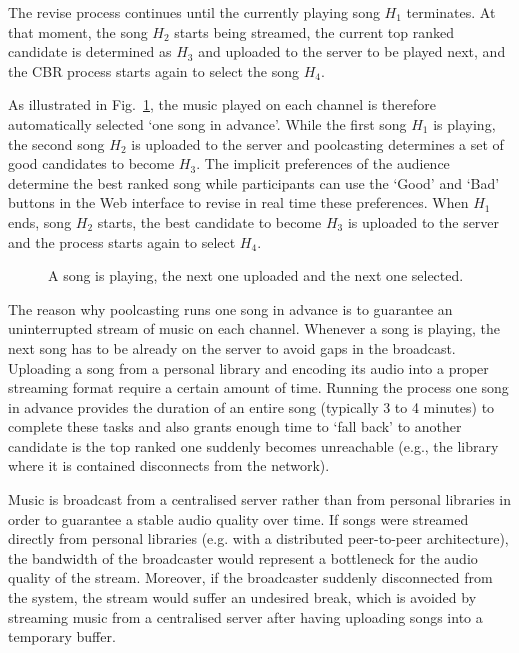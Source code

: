 The revise process continues until the currently playing song $H_1$ terminates. At that moment, the song $H_2$ starts being streamed, the current top ranked candidate is determined as $H_3$ and uploaded to the server to be played next, and the CBR process starts again to select the song $H_4$.

As illustrated in Fig.~\ref{fig:select_and_deliver}, the music played on each channel is therefore automatically selected `one song in advance'.
While the first song $H_1$ is playing, the second song $H_2$ is uploaded to the server and poolcasting determines a set of good candidates to become $H_3$.
The implicit preferences of the audience determine the best ranked song while participants can use the `Good' and `Bad' buttons in the Web interface to revise in real time these preferences.
When $H_1$ ends, song $H_2$ starts, the best candidate to become $H_3$ is uploaded to the server and the process starts again to select $H_4$.
%
\begin{figure}[bthp]
\centering \setlength{\abovecaptionskip}{3pt}
\caption{A song is playing, the next one uploaded and the next one selected.}
\label{fig:select_and_deliver}
\end{figure}

The reason why poolcasting runs one song in advance is to guarantee an uninterrupted stream of music on each channel.
Whenever a song is playing, the next song has to be already on the server to avoid gaps in the broadcast.
Uploading a song from a personal library and encoding its audio into a proper streaming format require a certain amount of time.
Running the process one song in advance provides the duration of an entire song (typically 3 to 4 minutes) to complete these tasks and also grants enough time to `fall back' to another candidate is the top ranked one suddenly becomes unreachable (e.g., the library where it is contained disconnects from the network).

Music is broadcast from a centralised server rather than from personal libraries in order to guarantee a stable audio quality over time.
If songs were streamed directly from personal libraries (e.g. with a distributed peer-to-peer architecture), the bandwidth of the broadcaster would represent a bottleneck for the audio quality of the stream.
Moreover, if the broadcaster suddenly disconnected from the system, the stream would suffer an undesired break, which is avoided by streaming music from a centralised server after having uploading songs into a temporary buffer.

